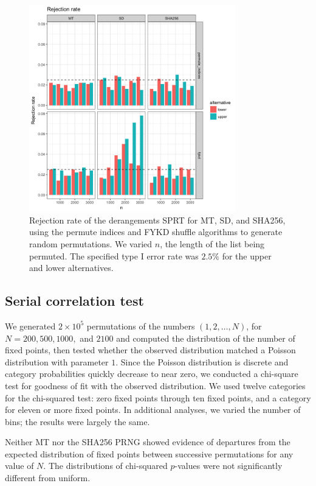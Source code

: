 \documentclass[12pt]{article}
\begin{document}
\begin{figure}[h]
\begin{center}
\includegraphics[width=0.8\textwidth]{fig/sprt-derangement-rejection-rate.png}
\caption{Rejection rate of the derangements SPRT for MT, SD, and SHA256, using the permute indices and FYKD shuffle algorithms to generate random permutations. We varied $n$, the length of the list being permuted.  The specified type I error rate was $2.5\%$ for the upper and lower alternatives.}
\label{fig:derangement_sprt_rejections}
\end{center}
\end{figure}

\subsection{Serial correlation test}
We generated $2 \times 10^5$ permutations of the numbers $(1, 2, \dots, N)$, for $N = 200, 500, 1000, $ and $2100$ 
and computed the distribution of the number of fixed points, then tested whether the observed distribution matched a Poisson distribution with parameter $1$.
Since the Poisson distribution is discrete and category probabilities quickly decrease to near zero, we conducted a chi-square test for goodness of fit with the observed distribution.
We used twelve categories for the chi-squared test: zero fixed points through ten fixed points, and a category for eleven or more fixed points.
In additional analyses, we varied the number of bins; the results were largely the same.

Neither MT nor the SHA256 PRNG showed evidence of departures from the expected distribution of fixed points between successive permutations for any value of $N$.
The distributions of chi-squared $p$-values were not significantly different from uniform.
\end{document}
